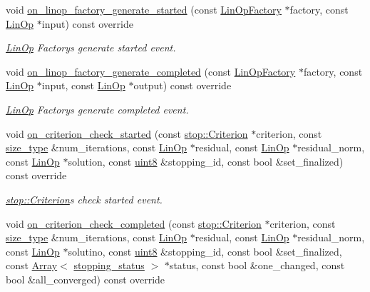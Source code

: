 \begin{DoxyCompactItemize}
void \hyperlink{classgko_1_1log_1_1Stream_afa60da90a69a07a79ac8c8837aeb02cd}{on\+\_\+linop\+\_\+factory\+\_\+generate\+\_\+started} (const \hyperlink{classgko_1_1LinOpFactory}{Lin\+Op\+Factory} $\ast$factory, const \hyperlink{classgko_1_1LinOp}{Lin\+Op} $\ast$input) const override
\begin{DoxyCompactList}\small\item\em \hyperlink{classgko_1_1LinOp}{Lin\+Op} Factory\textquotesingle{}s generate started event. \end{DoxyCompactList}\item 
void \hyperlink{classgko_1_1log_1_1Stream_aedc38a16e05ae312d133803a50c6a938}{on\+\_\+linop\+\_\+factory\+\_\+generate\+\_\+completed} (const \hyperlink{classgko_1_1LinOpFactory}{Lin\+Op\+Factory} $\ast$factory, const \hyperlink{classgko_1_1LinOp}{Lin\+Op} $\ast$input, const \hyperlink{classgko_1_1LinOp}{Lin\+Op} $\ast$output) const override
\begin{DoxyCompactList}\small\item\em \hyperlink{classgko_1_1LinOp}{Lin\+Op} Factory\textquotesingle{}s generate completed event. \end{DoxyCompactList}\item 
void \hyperlink{classgko_1_1log_1_1Stream_a7ae44ba6930d61388259a09c730ba2f3}{on\+\_\+criterion\+\_\+check\+\_\+started} (const \hyperlink{classgko_1_1stop_1_1Criterion}{stop\+::\+Criterion} $\ast$criterion, const \hyperlink{namespacegko_a6e5c95df0ae4e47aab2f604a22d98ee7}{size\+\_\+type} \&num\+\_\+iterations, const \hyperlink{classgko_1_1LinOp}{Lin\+Op} $\ast$residual, const \hyperlink{classgko_1_1LinOp}{Lin\+Op} $\ast$residual\+\_\+norm, const \hyperlink{classgko_1_1LinOp}{Lin\+Op} $\ast$solution, const \hyperlink{namespacegko_a3950fc3732811a8563484e5098c31531}{uint8} \&stopping\+\_\+id, const bool \&set\+\_\+finalized) const override
\begin{DoxyCompactList}\small\item\em \hyperlink{classgko_1_1stop_1_1Criterion}{stop\+::\+Criterion}\textquotesingle{}s check started event. \end{DoxyCompactList}\item 
void \hyperlink{classgko_1_1log_1_1Stream_a9e13f363f4318fcc1269eb9b05dd3597}{on\+\_\+criterion\+\_\+check\+\_\+completed} (const \hyperlink{classgko_1_1stop_1_1Criterion}{stop\+::\+Criterion} $\ast$criterion, const \hyperlink{namespacegko_a6e5c95df0ae4e47aab2f604a22d98ee7}{size\+\_\+type} \&num\+\_\+iterations, const \hyperlink{classgko_1_1LinOp}{Lin\+Op} $\ast$residual, const \hyperlink{classgko_1_1LinOp}{Lin\+Op} $\ast$residual\+\_\+norm, const \hyperlink{classgko_1_1LinOp}{Lin\+Op} $\ast$solutino, const \hyperlink{namespacegko_a3950fc3732811a8563484e5098c31531}{uint8} \&stopping\+\_\+id, const bool \&set\+\_\+finalized, const \hyperlink{classgko_1_1Array}{Array}$<$ \hyperlink{classgko_1_1stopping__status}{stopping\+\_\+status} $>$ $\ast$status, const bool \&one\+\_\+changed, const bool \&all\+\_\+converged) const override

\end{DoxyCompactItemize}
